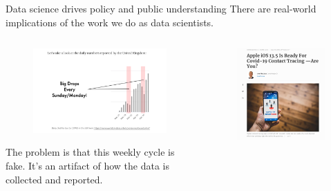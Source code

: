 \documentclass[aspectratio=169]{../latex_main/tntbeamer}  %
\begin{document}
    
    \begin{frame}{Data science drives policy and public understanding}
        There are real-world implications of the work we do as data scientists.
        \begin{columns}
            \begin{column}{.6\textwidth}
                    \begin{figure}
                        \centering
                        \includegraphics[scale=.5]{bild6}
                    \end{figure}
                    The problem is that this weekly cycle is fake. It's an artifact of how the data is collected and reported.
            \end{column}
            
            \begin{column}{.4\textwidth}
                    \begin{figure}
                        \centering
                        \includegraphics[scale=.5]{bild7}
                    \end{figure}
            \end{column}
        \end{columns}
    \end{frame}
\end{document}

